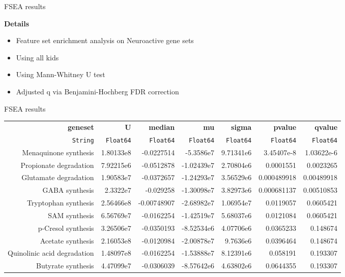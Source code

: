 \begin{frame}{FSEA results}

    \textbf{Details}
    \begin{itemize}
        \item Feature set enrichment analysis on Neuroactive gene sets
        \item Using all kids
        \item Using Mann-Whitney U test
        \item Adjusted q via Benjamini-Hochberg FDR correction
    \end{itemize}
\end{frame}

\begin{frame}{FSEA results}

    \begin{table}
        \tiny
        \begin{tabular}{rrrrrrr}
            \hline\hline
            \textbf{geneset} & \textbf{U} & \textbf{median} & \textbf{mu} & \textbf{sigma} & \textbf{pvalue} & \textbf{qvalue} \\
            \texttt{String} & \texttt{Float64} & \texttt{Float64} & \texttt{Float64} & \texttt{Float64} & \texttt{Float64} & \texttt{Float64} \\\hline
            Menaquinone synthesis & 1.80133e8 & -0.0227514 & -5.3586e7 & 9.71341e6 & 3.45407e-8 & 1.03622e-6 \\
            Propionate degradation & 7.92215e6 & -0.0512878 & -1.02439e7 & 2.70804e6 & 0.0001551 & 0.0023265 \\
            Glutamate degradation & 1.90583e7 & -0.0372657 & -1.24293e7 & 3.56529e6 & 0.000489918 & 0.00489918 \\
            GABA synthesis & 2.3322e7 & -0.029258 & -1.30098e7 & 3.82973e6 & 0.000681137 & 0.00510853 \\
            Tryptophan synthesis & 2.56466e8 & -0.00748907 & -2.68982e7 & 1.06954e7 & 0.0119057 & 0.0605421 \\
            SAM synthesis & 6.56769e7 & -0.0162254 & -1.42519e7 & 5.68037e6 & 0.0121084 & 0.0605421 \\
            p-Cresol synthesis & 3.26506e7 & -0.0350193 & -8.52534e6 & 4.07706e6 & 0.0365233 & 0.148674 \\
            Acetate synthesis & 2.16053e8 & -0.0120984 & -2.00878e7 & 9.7636e6 & 0.0396464 & 0.148674 \\
            Quinolinic acid degradation & 1.48097e8 & -0.0162254 & -1.53888e7 & 8.12391e6 & 0.058191 & 0.193307 \\
            Butyrate synthesis & 4.47099e7 & -0.0306039 & -8.57642e6 & 4.63802e6 & 0.0644355 & 0.193307 \\\hline\hline
        \end{tabular}
    \end{table}

\end{frame} 

